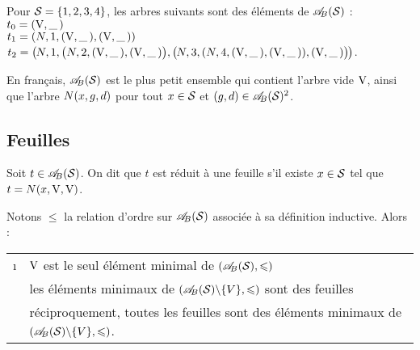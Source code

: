 		\begin{Exemple}
			Pour \(\cal{S} = \{1,2,3,4\}\), les arbres suivants sont des éléments de \(\AB(\cal{S})\) : \\
				\(t_0 = (\V,\_\,)\) \\
				\(t_1 = (\N,1,(\V,\_\,),(\V,\_\,))\) \\
				\(t_2 = \big(\hs{-0.3}\N,1,\big(\N,2,(\V,\_\,),(\V,\_\,)\big),\big(\hs{-0.3}\N,3,(\N,4,(\V,\_\,),(\V,\_\,)),(\V,\_\,)\big)\hs{-0.3}\big)\).
		\end{Exemple}
		
		\begin{Remarque}
			En français, \(\AB(\cal{S})\) est le plus petit ensemble qui contient l'arbre vide \(\V\), ainsi que l'arbre \(\N(x,g,d)\) pour tout \(x\in\cal{S}\) et \((g,d) \in \AB(\cal{S})^2\).
		\end{Remarque}
	
	\subsection{Feuilles}
	
		
		\begin{Definition}
			Soit \(t\in\AB(\cal{S})\). On dit que \(t\) est réduit à une feuille s'il existe \(x\in\cal{S}\) tel que \(t = \N(x,\V,\V)\).
		\end{Definition}
	
		\begin{Proprietes}
			Notons \(\leqslant\) la relation d'ordre sur \(\AB(\cal{S})\) associée à sa définition inductive. Alors : \nt \colsep{1.5pt}
				\begin{tabular}[h]{cl}
					\i & \(\V\) est le seul élément minimal de \((\AB(\cal{S}),\leqslant)\) \\
					\ii & les éléments minimaux de \((\AB(\cal{S})\backslash\{V\},\leqslant)\) sont des feuilles \\
					\iii & réciproquement, toutes les feuilles sont des éléments minimaux de \((\AB(\cal{S})\backslash\{V\},\leqslant)\).
				\end{tabular}
		\end{Proprietes}
			
